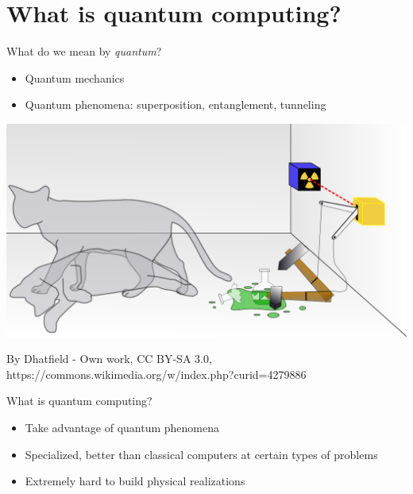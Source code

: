 \documentclass[14pt]{beamer}
\let\olditem\item
\renewcommand{\item}{%
\olditem\vspace{10pt}}
\begin{document}
\section{What is quantum computing?}
\begin{frame}{What do we mean by \textit{quantum}?}
\begin{itemize}
	\item Quantum mechanics
	\item Quantum phenomena: superposition, 	entanglement, tunneling 
\end{itemize}
\begin{center}
\includegraphics[scale=0.15]{../resources/images/Schrodingers_cat.png}\\
{\tiny By Dhatfield - Own work, CC BY-SA 3.0, https://commons.wikimedia.org/w/index.php?curid=4279886\par}
\end{center}
\end{frame}

\begin{frame}{What is quantum computing?}
\begin{itemize}
	\item Take advantage of quantum phenomena	
	\item Specialized, better than classical computers at certain types of problems
	\item Extremely hard to build physical realizations
\end{itemize}
\end{frame}

\end{document}
